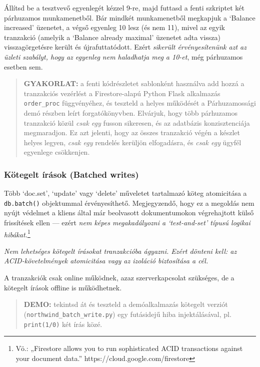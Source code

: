 \documentclass[
  magyar,
]{article}
\begin{document}
Állítsd be a tesztvevő egyenlegét kézzel 9-re, majd futtasd a fenti
szkriptet két párhuzamos munkamenetből. Bár mindkét munkamenetből
megkapjuk a `Balance increased' üzenetet, a végső egyenleg 10 lesz (és
nem 11), mivel az egyik tranzakció (amelyik a `Balance already maximal'
üzenetet adta vissza) visszagörgetésre került és újrafuttatódott. Ezért
\emph{sikerült érvényesítenünk azt az üzleti szabályt, hogy az egyenleg
nem haladhatja meg a 10-et}, még párhuzamos esetben sem.

\begin{quote}
\textbf{GYAKORLAT:} a fenti kódrészletet sablonként használva add hozzá
a tranzakciós vezérlést a Firestore-alapú Python Flask alkalmazás
\texttt{order\_proc} függvényéhez, és teszteld a helyes működését a
Párhuzamossági demó részben leírt forgatókönyvben. Elvárjuk, hogy több
párhuzamos tranzakció közül \emph{csak egy} fusson sikeresen, és az
adatbázis konzisztenciája megmaradjon. Ez azt jelenti, hogy az összes
tranzakció végén a készlet helyes legyen, \emph{csak egy} rendelés
kerüljön elfogadásra, és \emph{csak egy} ügyfél egyenlege csökkenjen.
\end{quote}

\subsubsection{Kötegelt írások (Batched
writes)}\label{kuxf6tegelt-uxedruxe1sok-batched-writes}

Több `doc.set', `update' vagy `delete' műveletet tartalmazó köteg
atomicitása a \texttt{db.batch()} objektummal érvényesíthető.
Megjegyzendő, hogy ez a megoldás nem nyújt védelmet a kliens által már
beolvasott dokumentumokon végrehajtott külső frissítések ellen --- ezért
\emph{nem képes megakadályozni a `test-and-set' típusú logikai
hibákat.}\footnote{Vö.: „Firestore allows you to run sophisticated ACID
  transactions against your document data.''
  https://cloud.google.com/firestore}

\emph{Nem lehetséges kötegelt írásokat tranzakcióba ágyazni. Ezért
dönteni kell: az ACID-követelmények atomicitása vagy az izoláció
biztosítása a cél.}

A tranzakciók csak online működnek, azaz szerverkapcsolat szükséges, de
a kötegelt írások offline is működhetnek.

\begin{quote}
\textbf{DEMO:} tekintsd át és teszteld a demóalkalmazás kötegelt verziót
(\texttt{northwind\_batch\_write.py}) egy futásidejű hiba
injektálásával, pl. \texttt{print(1/0)} két írás közé.
\end{quote}
\end{document}
